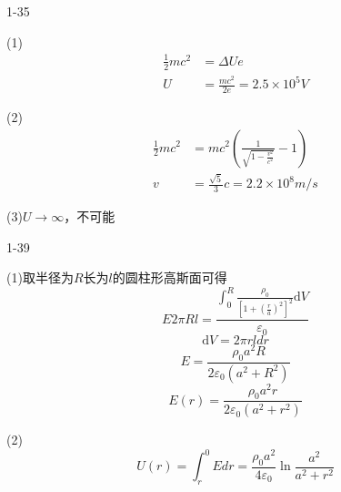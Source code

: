 \documentclass{phyasgn}
\begin{document}
{\heiti\color{red} 1-35}
\begin{sol}
    (1)$$
    \begin{aligned}
        \frac{1}{2}mc^2&=\Delta Ue\\
        U&=\frac{mc^2}{2e}=2.5\times 10^5V
    \end{aligned}
    $$\par
    (2)$$
    \begin{aligned}
        \frac{1}{2}mc^2&=mc^2(\frac{1}{\sqrt{1-\frac{v^2}{c^2}}}-1)\\
        v&=\frac{\sqrt{5}}{3}c=2.2\times 10^8m/s
    \end{aligned}
    $$\par
    (3)$U\to \infty$，不可能
\end{sol}\par

{\heiti\color{red} 1-39}
\begin{sol}
    (1)取半径为$R$长为$l$的圆柱形高斯面可得
    $$E2\pi Rl=\frac{\int^R_0\frac{\rho_0}{[1+(\frac{r}{a})^2]^2}\mathrm{d}V}{\varepsilon_0}$$
    $$\mathrm{d}V=2\pi rldr$$
    $$E=\frac{\rho_0a^2R}{2\varepsilon_0(a^2+R^2)}$$
    $$E(r)=\frac{\rho_0a^2r}{2\varepsilon_0(a^2+r^2)}$$\par
    (2)$$U(r)=\int_r^0Edr=\frac{\rho_0a^2}{4\varepsilon_0}\ln\frac{a^2}{a^2+r^2}$$
\end{sol}\par
\end{document}

